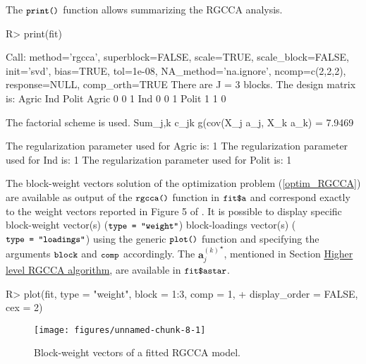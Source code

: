 \documentclass[
]{jss}
\begin{document}
\normalsize

The \(\small{\texttt{print()}}\) function allows summarizing the RGCCA
analysis.

\footnotesize

\begin{CodeChunk}
\begin{CodeInput}
R> print(fit)
\end{CodeInput}
\begin{CodeOutput}
Call: method='rgcca', superblock=FALSE, scale=TRUE, scale_block=FALSE, init='svd',
bias=TRUE, tol=1e-08, NA_method='na.ignore', ncomp=c(2,2,2), response=NULL,
comp_orth=TRUE 
There are J = 3 blocks.
The design matrix is:
      Agric Ind Polit
Agric     0   0     1
Ind       0   0     1
Polit     1   1     0

The factorial scheme is used.
Sum_{j,k} c_jk g(cov(X_j a_j, X_k a_k) = 7.9469 

The regularization parameter used for Agric is: 1
The regularization parameter used for Ind is: 1
The regularization parameter used for Polit is: 1
\end{CodeOutput}
\end{CodeChunk}

\normalsize

The block-weight vectors solution of the optimization problem
(\ref{optim_RGCCA}) are available as output of the
\(\small{\texttt{rgcca()}}\) function in \(\small{\texttt{fit\$a}}\) and
correspond exactly to the weight vectors reported in Figure 5 of
\cite{Tenenhaus2011}. It is possible to display specific block-weight
vector(s) (\(\small{\texttt{type = "weight"}}\)) block-loadings
vector(s) (\(\small{\texttt{type = "loadings"}}\)) using the generic
\(\small{\texttt{plot()}}\) function and specifying the arguments
\(\small{\texttt{block}}\) and \(\small{\texttt{comp}}\) accordingly.
The \({ \mathbf a_j^{(k)}}^\star\), mentioned in Section
\protect\hyperlink{higher-level-rgcca-algorithm}{Higher level RGCCA
algorithm}, are available in \(\small{\texttt{fit\$astar}}\).

\footnotesize

\begin{CodeChunk}
\begin{CodeInput}
R> plot(fit, type = "weight", block = 1:3, comp = 1,
+      display_order = FALSE, cex = 2)
\end{CodeInput}
\begin{figure}[H]

{\centering \texttt{[image: figures/unnamed-chunk-8-1]} 

}

\caption[Block-weight vectors of a fitted RGCCA model]{Block-weight vectors of a fitted RGCCA model.}\label{fig:unnamed-chunk-8}
\end{figure}
\end{CodeChunk}
\end{document}
